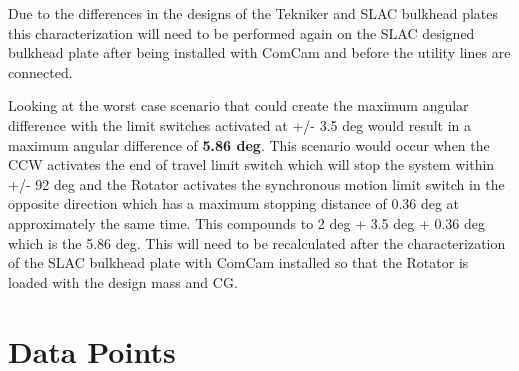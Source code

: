 \documentclass[SE,lsstdraft,authoryear,toc]{lsstdoc}
\begin{document}
Due to the differences in the designs of the Tekniker and SLAC bulkhead
plates this characterization will need to be performed again on the SLAC
designed bulkhead plate after being installed with ComCam and before the
utility lines are connected.

Looking at the worst case scenario that could create the maximum angular
difference with the limit switches activated at +/- 3.5 deg would result
in a maximum angular difference of \textbf{5.86 deg}. This scenario
would occur when the CCW activates the end of travel limit switch which
will stop the system within +/- 92 deg and the Rotator activates the
synchronous motion limit switch in the opposite direction which has a
maximum stopping distance of 0.36 deg at approximately the same time.
This compounds to 2 deg + 3.5 deg + 0.36 deg which is the 5.86 deg. This
will need to be recalculated after the characterization of the SLAC
bulkhead plate with ComCam installed so that the Rotator is loaded with
the design mass and CG.

\appendix
\section{Data Points}
\end{document}
